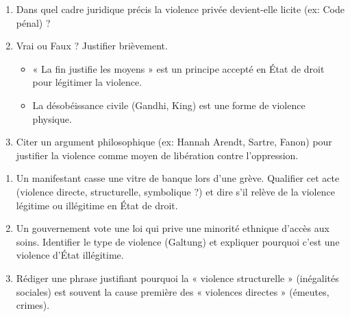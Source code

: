 \documentclass[11pt]{article}
\begin{document}
\begin{exercice}
\begin{enumerate}
    \item Dans quel cadre juridique précis la violence privée devient-elle licite (ex: Code pénal) ?
    \item Vrai ou Faux ? Justifier brièvement.
    \begin{itemize}
        \item « La fin justifie les moyens » est un principe accepté en État de droit pour légitimer la violence.
        \item La désobéissance civile (Gandhi, King) est une forme de violence physique.
    \end{itemize}
    \item Citer un argument philosophique (ex: Hannah Arendt, Sartre, Fanon) pour justifier la violence comme moyen de libération contre l'oppression.
\end{enumerate}
\end{exercice}

\begin{exercice}
\begin{enumerate}
    \item Un manifestant casse une vitre de banque lors d'une grève. Qualifier cet acte (violence directe, structurelle, symbolique ?) et dire s'il relève de la violence légitime ou illégitime en État de droit.
    \item Un gouvernement vote une loi qui prive une minorité ethnique d'accès aux soins. Identifier le type de violence (Galtung) et expliquer pourquoi c'est une violence d'État illégitime.
    \item Rédiger une phrase justifiant pourquoi la « violence structurelle » (inégalités sociales) est souvent la cause première des « violences directes » (émeutes, crimes).
\end{enumerate}
\end{exercice}
\end{document}

